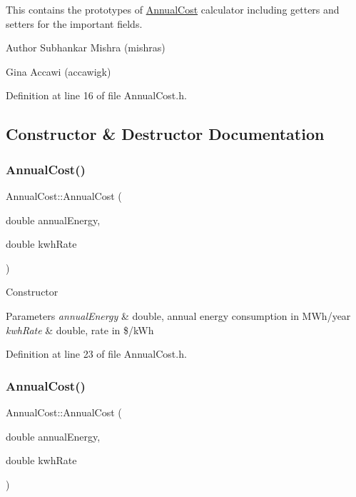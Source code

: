 This contains the prototypes of \hyperlink{class_annual_cost}{Annual\+Cost} calculator including getters and setters for the important fields.

\begin{DoxyAuthor}{Author}
Subhankar Mishra (mishras) 

Gina Accawi (accawigk) 
\end{DoxyAuthor}


Definition at line 16 of file Annual\+Cost.\+h.



\subsection{Constructor \& Destructor Documentation}
\mbox{\label{class_annual_cost_a723513a7074d1799e2bf410b60b3146f}} 
\subsubsection{\texorpdfstring{Annual\+Cost()}{AnnualCost()}\hspace{0.1cm}{\footnotesize\ttfamily [1/3]}}
{\footnotesize\ttfamily Annual\+Cost\+::\+Annual\+Cost (\begin{DoxyParamCaption}\item[{double}]{annual\+Energy,  }\item[{double}]{kwh\+Rate }\end{DoxyParamCaption})\hspace{0.3cm}{\ttfamily [inline]}}

Constructor 
\begin{DoxyParams}{Parameters}
{\em annual\+Energy} & double, annual energy consumption in M\+Wh/year \\
\hline
{\em kwh\+Rate} & double, rate in \$/k\+Wh \\
\hline
\end{DoxyParams}


Definition at line 23 of file Annual\+Cost.\+h.

\mbox{\label{class_annual_cost_a723513a7074d1799e2bf410b60b3146f}} 
\subsubsection{\texorpdfstring{Annual\+Cost()}{AnnualCost()}\hspace{0.1cm}{\footnotesize\ttfamily [2/3]}}
{\footnotesize\ttfamily Annual\+Cost\+::\+Annual\+Cost (\begin{DoxyParamCaption}\item[{double}]{annual\+Energy,  }\item[{double}]{kwh\+Rate }\end{DoxyParamCaption})\hspace{0.3cm}{\ttfamily [inline]}}

